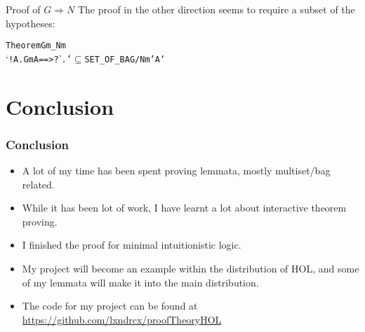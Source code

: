 \documentclass[english,svgnames,hide notes,12pt]{beamer}
\theoremstyle{definition}
\theoremstyle{remark}
\begin{document}
\begin{frame}[fragile]{Proof of $G\Rightarrow N$}
    The proof in the other direction seems to require a subset of the hypotheses:
    \begin{alltt}
Theorem Gm_Nm 
`!\textGamma A. Gm \textGamma A ==> ?\textGamma'. \textGamma' \(\subseteq\) SET_OF_BAG \textGamma /\bs{} Nm \textGamma' A` 
    \end{alltt}
\end{frame}

\section{Conclusion}

\begin{frame}
    \frametitle{Conclusion}
    \begin{itemize}
        \item A lot of my time has been spent proving lemmata, mostly multiset/bag related.
        \item While it has been lot of work, I have learnt a lot about interactive theorem proving.
        \item I finished the proof for minimal intuitionistic logic.
        \item My project will become an example within the distribution of HOL, and some of my lemmata will make it into the main distribution.
        \item The code for my project can be found at \url{https://github.com/lxndrcx/proofTheoryHOL}
    \end{itemize}
\end{frame}
\end{document}
